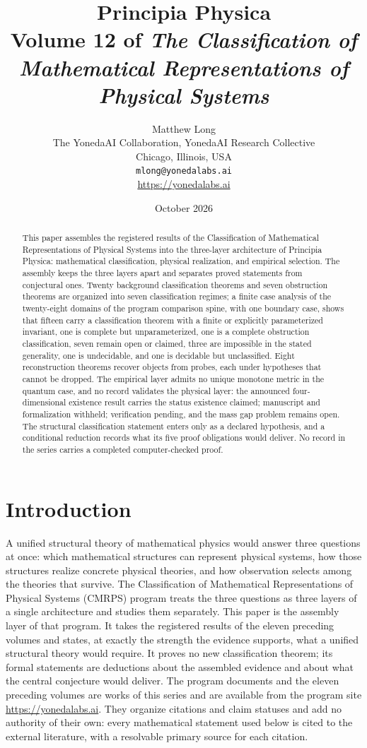 \documentclass[11pt,letterpaper]{article}
\title{Principia Physica\\[4pt]
  {\normalsize Volume 12 of \emph{The Classification of Mathematical Representations of Physical Systems}}}
\author{Matthew Long\\
  \small The YonedaAI Collaboration, YonedaAI Research Collective\\
  \small Chicago, Illinois, USA\\
  \small \texttt{mlong@yonedalabs.ai}\\
  \small \url{https://yonedalabs.ai}}
\date{October 2026}
\theoremstyle{definition}
\begin{document}
\maketitle

\begin{abstract}
This paper assembles the registered results of the Classification of Mathematical Representations of Physical Systems into the three-layer architecture of Principia Physica: mathematical classification, physical realization, and empirical selection. The assembly keeps the three layers apart and separates proved statements from conjectural ones. Twenty background classification theorems and seven obstruction theorems are organized into seven classification regimes; a finite case analysis of the twenty-eight domains of the program comparison spine, with one boundary case, shows that fifteen carry a classification theorem with a finite or explicitly parameterized invariant, one is complete but unparameterized, one is a complete obstruction classification, seven remain open or claimed, three are impossible in the stated generality, one is undecidable, and one is decidable but unclassified. Eight reconstruction theorems recover objects from probes, each under hypotheses that cannot be dropped. The empirical layer admits no unique monotone metric in the quantum case, and no record validates the physical layer: the announced four-dimensional existence result carries the status existence claimed; manuscript and formalization withheld; verification pending, and the mass gap problem remains open. The structural classification statement enters only as a declared hypothesis, and a conditional reduction records what its five proof obligations would deliver. No record in the series carries a completed computer-checked proof.
\end{abstract}

\section{Introduction}

A unified structural theory of mathematical physics would answer three questions at once: which mathematical structures can represent physical systems, how those structures realize concrete physical theories, and how observation selects among the theories that survive. The Classification of Mathematical Representations of Physical Systems (CMRPS) program treats the three questions as three layers of a single architecture and studies them separately. This paper is the assembly layer of that program. It takes the registered results of the eleven preceding volumes and states, at exactly the strength the evidence supports, what a unified structural theory would require. It proves no new classification theorem; its formal statements are deductions about the assembled evidence and about what the central conjecture would deliver. The program documents and the eleven preceding volumes are works of this series and are available from the program site \url{https://yonedalabs.ai}. They organize citations and claim statuses and add no authority of their own: every mathematical statement used below is cited to the external literature, with a resolvable primary source for each citation.
\end{document}
